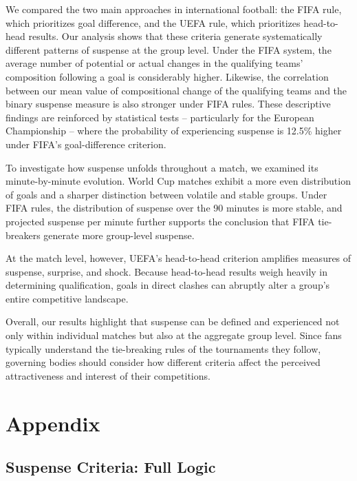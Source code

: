 \documentclass[11pt]{article}
\begin{document}
We compared the two main approaches in international football: the FIFA rule, which prioritizes goal difference, and the UEFA rule, which prioritizes head-to-head results. Our analysis shows that these criteria generate systematically different patterns of suspense at the group level. Under the FIFA system, the average number of potential or actual changes in the qualifying teams’ composition following a goal is considerably higher. Likewise, the correlation between our mean value of compositional change of the qualifying teams  and the binary suspense measure is also stronger under FIFA rules. These descriptive findings are reinforced by statistical tests -- particularly for the European Championship -- where the probability of experiencing suspense is 12.5\% higher under FIFA’s goal-difference criterion.

To investigate how suspense unfolds throughout a match, we examined its minute-by-minute evolution. World Cup matches exhibit a more even distribution of goals and a sharper distinction between volatile and stable groups. Under FIFA rules, the distribution of suspense over the 90 minutes is more stable, and projected suspense per minute further supports the conclusion that FIFA tie-breakers generate more group-level suspense.

At the match level, however, UEFA’s head-to-head criterion amplifies measures of suspense, surprise, and shock. Because head-to-head results weigh heavily in determining qualification, goals in direct clashes can abruptly alter a group’s entire competitive landscape.

Overall, our results highlight that suspense can be defined and experienced not only within individual matches but also at the aggregate group level. Since fans typically understand the tie-breaking rules of the tournaments they follow, governing bodies should consider how different criteria affect the perceived attractiveness and interest of their competitions.

 


 


\appendix

\section{Appendix}
\subsection{Suspense Criteria: Full Logic}
\label{sec:suspense-criteria}
\end{document}
